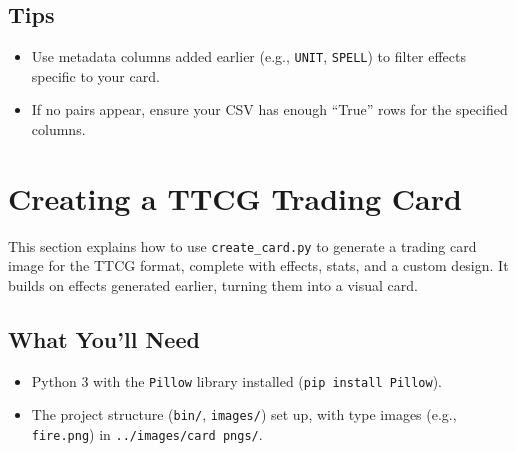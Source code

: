 \subsection{Tips}
\begin{itemize}
	\item Use metadata columns added earlier (e.g., \texttt{UNIT}, \texttt{SPELL}) to filter effects specific to your card.
	\item If no pairs appear, ensure your CSV has enough ``True'' rows for the specified columns.
\end{itemize}














\section{Creating a TTCG Trading Card}

This section explains how to use \texttt{create\_card.py} to generate a trading card image for the TTCG format, complete with effects, stats, and a custom design. It builds on effects generated earlier, turning them into a visual card.

\subsection{What You’ll Need}
\begin{itemize}
	\item Python 3 with the \texttt{Pillow} library installed (\texttt{pip install Pillow}).
	\item The project structure (\texttt{bin/}, \texttt{images/}) set up, with type images (e.g., \texttt{fire.png}) in \texttt{../images/card pngs/}.
\end{itemize}

